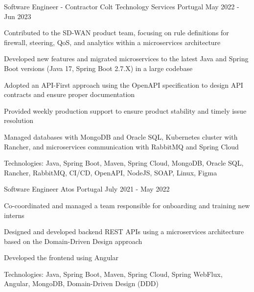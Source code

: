\begin{cventries}
  \cventry
    {Software Engineer - Contractor} %
    {Colt Technology Services} %
    {Portugal} %
    {May 2022 - Jun 2023} %
    {
      \begin{cvitems} %
        \item {Contributed to the SD-WAN product team, focusing on rule definitions for firewall, steering, QoS, and analytics within a microservices architecture}
        \item {Developed new features and migrated microservices to the latest Java and Spring Boot versions (Java 17, Spring Boot 2.7.X) in a large codebase}
        \item {Adopted an API-First approach using the OpenAPI specification to design API contracts and ensure proper documentation}
        \item {Provided weekly production support to ensure product stability and timely issue resolution}
        \item {Managed databases with MongoDB and Oracle SQL, Kubernetes cluster with Rancher, and microservices communication with RabbitMQ and Spring Cloud}
				\item {Technologies: Java, Spring Boot, Maven, Spring Cloud, MongoDB, Oracle SQL, Rancher, RabbitMQ, CI/CD, OpenAPI, NodeJS, SOAP, Linux, Figma}
      \end{cvitems}
    }

  \cventry
    {Software Engineer} %
    {Atos} %
    {Portugal} %
    {July 2021 - May 2022} %
    {
      \begin{cvitems} %
        \item {Co-coordinated and managed a team responsible for onboarding and training new interns}
        \item {Designed and developed backend REST APIs using a microservices architecture based on the Domain-Driven Design approach}
        \item {Developed the frontend using Angular}
        \item {Technologies: Java, Spring Boot, Maven, Spring Cloud, Spring WebFlux, Angular, MongoDB, Domain-Driven Design (DDD)}
      \end{cvitems}
    }

\end{cventries}
